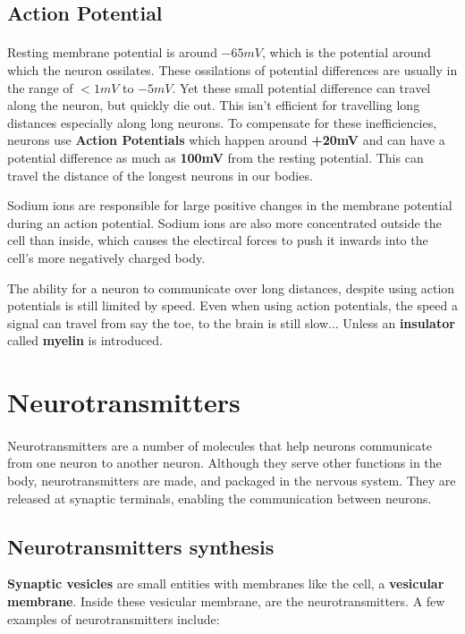 \documentclass[12pt, a4paper]{article}
\begin{document}
\subsection{Action Potential}
\paragraph*{}
Resting membrane potential is around $-65 mV$, which is the potential around which the neuron
ossilates. These ossilations of potential differences are usually in the range of
$<1mV$ to $-5mV$. Yet these small potential difference can travel along the neuron, but quickly die out.
This isn't efficient for travelling long distances especially along long neurons. To compensate for these
inefficiencies, neurons use \textbf{Action Potentials} which happen around 
\textbf{+20mV} and can have a potential difference as much as \textbf{100mV} 
from the resting potential. This can travel the distance of the longest neurons
in our bodies.

Sodium ions are responsible for large positive changes in the membrane potential during an action potential. Sodium ions
are also more concentrated outside the cell than inside, which causes the electircal forces to push it inwards into the cell's
more negatively charged body.

The ability for a neuron to communicate over long distances, despite using action potentials
is still limited by speed. Even when using action potentials, the speed a signal can travel from say the toe, to the brain
is still slow... Unless an \textbf{insulator} called \textbf{myelin} is introduced.

\section{Neurotransmitters}
\paragraph*{}
Neurotransmitters are a number of molecules that help neurons communicate from one neuron
to another neuron. Although they serve other functions in the body, neurotransmitters are made,
and packaged in the nervous system. They are released at synaptic terminals, enabling
the communication between neurons.

\subsection{Neurotransmitters synthesis}
\textbf{Synaptic vesicles} are small entities with membranes like the cell,
a \textbf{vesicular membrane}. Inside these vesicular membrane, are the neurotransmitters.
A few examples of neurotransmitters include:
\end{document}
